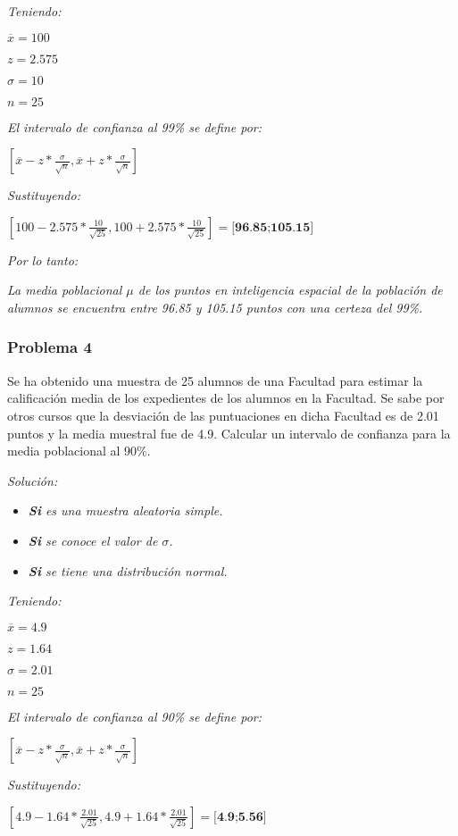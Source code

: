 \documentclass[a4paper, 12pt]{article}
\begin{document}
\emph{Teniendo:}

$\overline{x}=100$

$z=2.575$

$\sigma=10$

$n=25$

\emph{El intervalo de confianza al 99\% se define por:}

$[\overline{x}-z*\frac{\sigma}{\sqrt{n}}, \overline{x}+z*\frac{\sigma}{\sqrt{n}}]$

\emph{Sustituyendo:}

$[100-2.575*\frac{10}{\sqrt{25}}, 100+2.575*\frac{10}{\sqrt{25}}]=\textbf{[96.85;105.15]}$

\emph{Por lo tanto:}

\emph{La media poblacional $\mu$ de los puntos en inteligencia espacial de la población de alumnos se encuentra entre 96.85 y 105.15 puntos con una certeza del 99\%.}

\subsubsection{Problema 4}
Se ha obtenido una muestra de 25 alumnos de una Facultad para estimar la calificación media de los expedientes de los alumnos en la Facultad. Se sabe por otros cursos que la desviación de las puntuaciones en dicha Facultad es de 2.01 puntos y la media muestral fue de 4.9. Calcular un intervalo de confianza para la media poblacional al 90\%.

\emph{Solución:}

\begin{itemize}
    \item \emph{\textbf{Si} es una muestra aleatoria simple.}
    \item \emph{\textbf{Si} se conoce el valor de $\sigma$.}
    \item \emph{\textbf{Si} se tiene una distribución normal.}
\end{itemize}

\emph{Teniendo:}

$\overline{x}=4.9$

$z=1.64$

$\sigma=2.01$

$n=25$

\emph{El intervalo de confianza al 90\% se define por:}

$[\overline{x}-z*\frac{\sigma}{\sqrt{n}}, \overline{x}+z*\frac{\sigma}{\sqrt{n}}]$

\emph{Sustituyendo:}

$[4.9-1.64*\frac{2.01}{\sqrt{25}}, 4.9+1.64*\frac{2.01}{\sqrt{25}}]=\textbf{[4.9;5.56]}$
\end{document}

